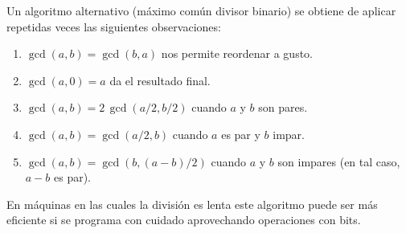   Un algoritmo alternativo
  (máximo común divisor binario)%
  se obtiene de aplicar repetidas veces
  las siguientes observaciones:
  \begin{enumerate}
  \item
    \(\gcd(a, b) = \gcd(b, a)\) nos permite reordenar a gusto.
  \item
    \(\gcd(a, 0) = a\) da el resultado final.
  \item
    \(\gcd(a, b) = 2 \, \gcd(a / 2, b / 2)\)
    cuando \(a\) y \(b\) son pares.
  \item
    \(\gcd(a, b) = \gcd(a / 2, b)\)
    cuando \(a\) es par y \(b\) impar.
  \item
    \(\gcd(a, b) = \gcd(b, (a - b) / 2)\)
    cuando \(a\) y \(b\) son impares
    (en tal caso, \(a - b\) es par).
  \end{enumerate}
  En máquinas en las cuales la división es lenta
  este algoritmo puede ser más eficiente
  si se programa con cuidado aprovechando operaciones con bits.


